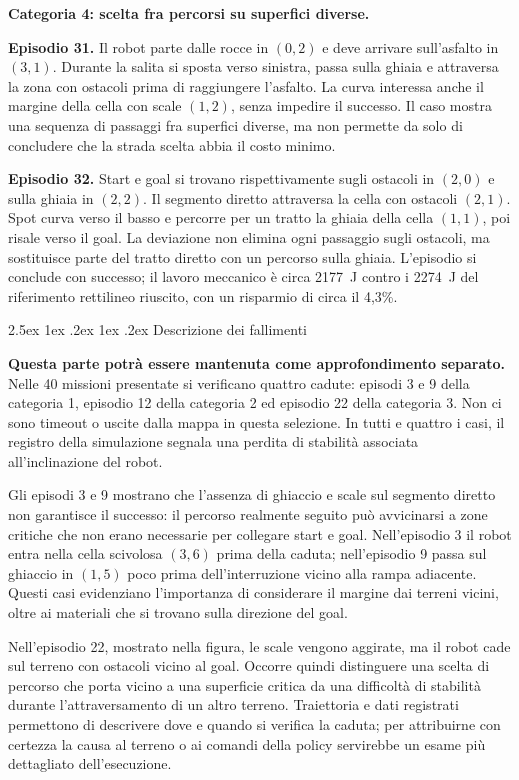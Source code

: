 \documentclass[11pt,a4paper]{article}
\makeatletter
\newcommand{\subsubsubsection}{%
  \@startsection{paragraph}{4}{\z@}%
  {2.5ex \@plus 1ex \@minus .2ex}%
  {1ex \@plus .2ex}%
  {\normalfont\normalsize\bfseries}}
\makeatother
\begin{document}
\textbf{Categoria 4: scelta fra percorsi su superfici diverse.}

\textbf{Episodio 31.} Il robot parte dalle rocce in $(0,2)$ e deve arrivare sull'asfalto in $(3,1)$. Durante la salita si sposta verso sinistra, passa sulla ghiaia e attraversa la zona con ostacoli prima di raggiungere l'asfalto. La curva interessa anche il margine della cella con scale $(1,2)$, senza impedire il successo. Il caso mostra una sequenza di passaggi fra superfici diverse, ma non permette da solo di concludere che la strada scelta abbia il costo minimo.

\textbf{Episodio 32.} Start e goal si trovano rispettivamente sugli ostacoli in $(2,0)$ e sulla ghiaia in $(2,2)$. Il segmento diretto attraversa la cella con ostacoli $(2,1)$. Spot curva verso il basso e percorre per un tratto la ghiaia della cella $(1,1)$, poi risale verso il goal. La deviazione non elimina ogni passaggio sugli ostacoli, ma sostituisce parte del tratto diretto con un percorso sulla ghiaia. L'episodio si conclude con successo; il lavoro meccanico è circa 2177~J contro i 2274~J del riferimento rettilineo riuscito, con un risparmio di circa il 4,3\%.

\subsubsubsection{Descrizione dei fallimenti}

\textbf{Questa parte potrà essere mantenuta come approfondimento separato.} Nelle 40 missioni presentate si verificano quattro cadute: episodi 3 e 9 della categoria 1, episodio 12 della categoria 2 ed episodio 22 della categoria 3. Non ci sono timeout o uscite dalla mappa in questa selezione. In tutti e quattro i casi, il registro della simulazione segnala una perdita di stabilità associata all'inclinazione del robot.

Gli episodi 3 e 9 mostrano che l'assenza di ghiaccio e scale sul segmento diretto non garantisce il successo: il percorso realmente seguito può avvicinarsi a zone critiche che non erano necessarie per collegare start e goal. Nell'episodio 3 il robot entra nella cella scivolosa $(3,6)$ prima della caduta; nell'episodio 9 passa sul ghiaccio in $(1,5)$ poco prima dell'interruzione vicino alla rampa adiacente. Questi casi evidenziano l'importanza di considerare il margine dai terreni vicini, oltre ai materiali che si trovano sulla direzione del goal.

Nell'episodio 22, mostrato nella figura, le scale vengono aggirate, ma il robot cade sul terreno con ostacoli vicino al goal. Occorre quindi distinguere una scelta di percorso che porta vicino a una superficie critica da una difficoltà di stabilità durante l'attraversamento di un altro terreno. Traiettoria e dati registrati permettono di descrivere dove e quando si verifica la caduta; per attribuirne con certezza la causa al terreno o ai comandi della policy servirebbe un esame più dettagliato dell'esecuzione.
\end{document}
